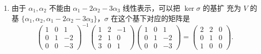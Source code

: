 \documentclass[UTF8,12pt,a4paper,fontset=fandol]{ctexart}
\begin{document}
\begin{solve}
\begin{enumerate}
        \item 由于 $\alpha_{1}, \alpha_{2}$ 不能由 $\alpha_{1}-2 \alpha_{2}-3 \alpha_{3}$ 线性表示，可以把 $\ker \sigma$ 的基扩 充为 $V$ 的基 $\{\alpha_{1}, \alpha_{2}, \alpha_{1}-2 \alpha_{2}-3 \alpha_{3}\}$，$\sigma$ 在这个基下对应的矩阵是
              \[\begin{pmatrix}
                      1 & 0 & 1  \\
                      0 & 1 & -2 \\
                      0 & 0 & -3
                  \end{pmatrix}^{-1}\begin{pmatrix}
                      1 & 2 & -1 \\
                      2 & 1 & 0  \\
                      3 & 0 & 1
                  \end{pmatrix}\begin{pmatrix}
                      1 & 0 & 1  \\
                      0 & 1 & -2 \\
                      0 & 0 & -3
                  \end{pmatrix}=\begin{pmatrix}
                      2 & 2 & 0 \\
                      0 & 1 & 0 \\
                      1 & 0 & 0
                  \end{pmatrix}.\]
    \end{enumerate}
\end{solve}
\end{document}
